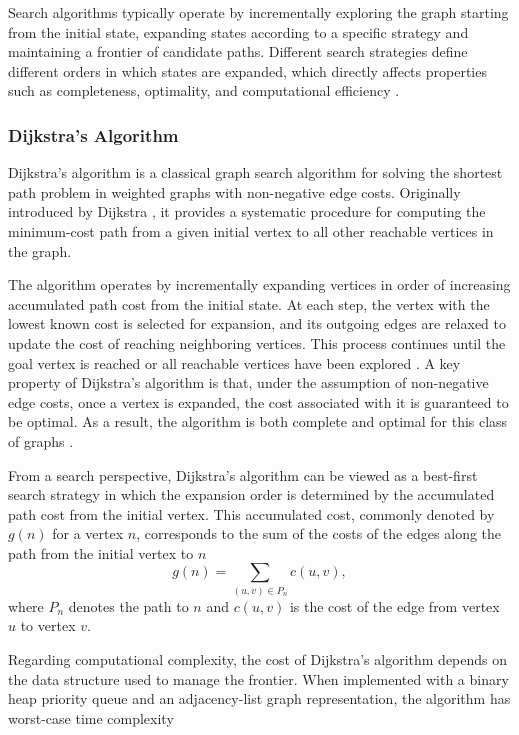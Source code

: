 Search algorithms typically operate by incrementally exploring the graph starting from the
initial state, expanding states according to a specific strategy and maintaining a frontier of
candidate paths. Different search strategies define different orders in which states are
expanded, which directly affects properties such as completeness, optimality, and computational
efficiency \cite{hart1968formal}.

\subsubsection{Dijkstra's Algorithm}
\hspace{\parindent}
Dijkstra's algorithm is a classical graph search algorithm for solving the shortest path problem
in weighted graphs with non-negative edge costs. Originally introduced by Dijkstra
\cite{dijkstra1959note}, it provides a systematic procedure for computing the minimum-cost path
from a given initial vertex to all other reachable vertices in the graph.

The algorithm operates by incrementally expanding vertices in order of increasing accumulated
path cost from the initial state. At each step, the vertex with the lowest known cost is selected
for expansion, and its outgoing edges are relaxed to update the cost of reaching neighboring
vertices. This process continues until the goal vertex is reached or all reachable vertices have
been explored \cite{cormen2009introduction}.
A key property of Dijkstra's algorithm is that, under the assumption of non-negative edge costs,
once a vertex is expanded, the cost associated with it is guaranteed to be optimal. As a result,
the algorithm is both complete and optimal for this class of graphs \cite{cormen2009introduction}.

From a search perspective, Dijkstra's algorithm can be viewed as a best-first search strategy in
which the expansion order is determined by the accumulated path cost from the initial
vertex. This accumulated cost, commonly denoted by $g(n)$ for a vertex $n$, corresponds to the
sum of the costs of the edges along the path from the initial vertex to $n$
\begin{equation}
\label{eq:gn}
g(n) = \sum_{(u,v) \in P_n} c(u,v),
\end{equation}
where $P_n$ denotes the path to $n$ and $c(u,v)$ is the cost of the edge from vertex $u$ to vertex $v$.


Regarding computational complexity, the cost of Dijkstra's algorithm depends on the data structure used to manage the frontier. When implemented with a binary heap priority queue and an adjacency-list graph representation, the algorithm has worst-case time complexity

